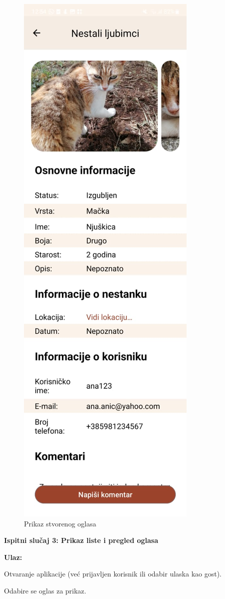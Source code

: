 \begin{figure}[H]
\begin{minipage}{.5\textwidth}
				  \includegraphics[width=.58\linewidth]{slike/app2v2.jpg}
				  \caption{Prikaz stvorenog oglasa}
				  \label{fig:app2v2}
			\end{minipage}
			\end{figure}

			\noindent \textbf{Ispitni  slučaj 3: Prikaz liste i pregled oglasa}

			\noindent \textbf{Ulaz: }
			\begin{packed_enum}
				\item Otvaranje aplikacije (već prijavljen korisnik ili odabir ulaska kao gost).
				\item Odabire se oglas za prikaz.
			\end{packed_enum}

